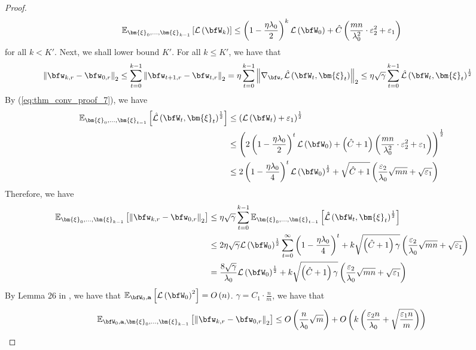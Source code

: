 \documentclass[10pt]{article} %
\theoremstyle{definition}
\theoremstyle{plain}
\newcommand{\paren}[1]{\left(#1\right)}
\newcommand{\norm}[1]{\left\|#1\right\|}
\providecommand{\E}{\mathbb{E}}
\def\calL{{\mathcal{L}}}
\def\bfa{{\mathbf{a}}}\def\bfb{{\mathbf{b}}}\def\bfc{{\mathbf{c}}}\def\bfd{{\mathbf{d}}}
\begin{document}
\begin{proof}
\begin{equation}
        \label{eq:thm_conv_proof_7}
        \E_{\bm{\xi}_0,\dots,\bm{\xi}_{k-1}}\left[\calL\paren{\bfW_{k}}\right] \leq \paren{1 - \frac{\eta\lambda_0}{2}}^k\calL\paren{\bfW_0} + \hat{C}\paren{\frac{mn}{\lambda_0^2}\cdot\varepsilon_2^2 + \varepsilon_1}
    \end{equation}
    for all $k < K'$. Next, we shall lower bound $K'$. For all $k \leq K'$, we have that
    \begin{align*}
        \norm{\bfw_{k,r} - \bfw_{0,r}}_2 & \leq \sum_{t=0}^{k-1}\norm{\bfw_{t+1,r} -\bfw_{t,r}}_2 = \eta\sum_{t=0}^{k-1}\norm{\nabla_{\bfw_r}\hat{\calL}\paren{\bfW_t,\bm{\xi}_t}}_2 \leq \eta\sqrt{\gamma}\sum_{t=0}^{k-1}\hat{\calL}\paren{\bfW_t,\bm{\xi}_t}^{\frac{1}{2}}
    \end{align*}
    By (\ref{eq:thm_conv_proof_7}), we have
    \begin{align*}
        \E_{\bm{\xi}_0,\dots,\bm{\xi}_{t-1}}\left[\hat{\calL}\paren{\bfW_t,\bm{\xi}_t}^{\frac{1}{2}}\right] & \leq \paren{\calL\paren{\bfW_t} + \varepsilon_1}^{\frac{1}{2}}\\
        & \leq \paren{2\paren{1 - \frac{\eta\lambda_0}{2}}^t\calL\paren{\bfW_0} + \paren{\hat{C}+1}\paren{\frac{mn}{\lambda_0^2}\cdot\varepsilon_2^2 + \varepsilon_1}}^{\frac{1}{2}}\\
        & \leq 2\paren{1 - \frac{\eta\lambda_0}{4}}^t\calL\paren{\bfW_0}^{\frac{1}{2}} + \sqrt{\hat{C}+1}\paren{\frac{\varepsilon_2}{\lambda_0}\sqrt{mn} + \sqrt{\varepsilon_1}}
    \end{align*}
    Therefore, we have
    \begin{align*}
        \E_{\bm{\xi}_0,\dots,\bm{\xi}_{k-1}}\left[\norm{\bfw_{k,r} - \bfw_{0,r}}_2\right] & \leq \eta\sqrt\gamma\sum_{t=0}^{k-1}\E_{\bm{\xi}_0,\dots,\bm{\xi}_{t-1}}\left[\hat{\calL}\paren{\bfW_t,\bm{\xi}_t}^{\frac{1}{2}}\right]\\
        & \leq 2\eta\sqrt{\gamma}\calL\paren{\bfW_0}^{\frac{1}{2}}\sum_{t=0}^\infty\paren{1 - \frac{\eta\lambda_0}{4}}^t + k\sqrt{\paren{\hat{C}+1}\gamma}\paren{\frac{\varepsilon_2}{\lambda_0}\sqrt{mn} + \sqrt{\varepsilon_1}}\\
        & = \frac{8\sqrt{\gamma}}{\lambda_0}\calL\paren{\bfW_0}^{\frac{1}{2}}+k\sqrt{\paren{\hat{C}+1}\gamma}\paren{\frac{\varepsilon_2}{\lambda_0}\sqrt{mn} + \sqrt{\varepsilon_1}}
    \end{align*}
    By Lemma 26 in \cite{}, we have that $\E_{\bfW_0,\bfa}\left[\calL\paren{\bfW_0}^2\right] = O\paren{n}$. $\gamma = C_1\cdot\frac{n}{m}$, we have that
    \[
        \E_{\bfW_0,\bfa,\bm{\xi}_0,\dots,\bm{\xi}_{k-1}}\left[\norm{\bfw_{k,r} - \bfw_{0,r}}_2\right] \leq O\paren{\frac{n}{\lambda_0}\sqrt{m}} + O\paren{k\paren{\frac{\varepsilon_2n}{\lambda_0} + \sqrt{\frac{\varepsilon_1n}{m}}}}
\]
\end{proof}
\end{document}
